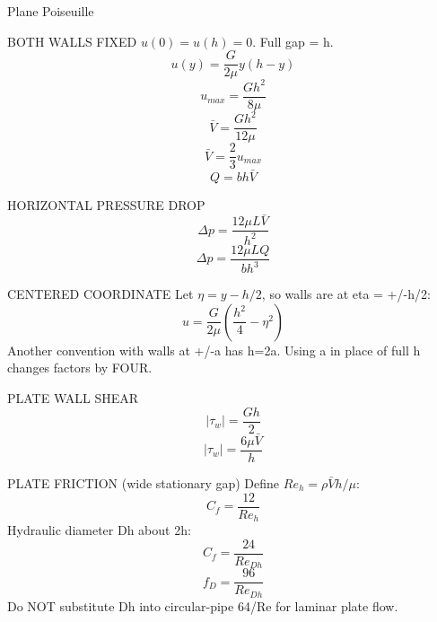 Plane Poiseuille

BOTH WALLS FIXED
$u(0)=u(h)=0$. Full gap = h.
$$u(y)=\frac{G}{2\mu}y(h-y)$$
$$u_{max}=\frac{Gh^2}{8\mu}$$
$$\bar V=\frac{Gh^2}{12\mu}$$
$$\bar V=\frac{2}{3}u_{max}$$
$$Q=bh\bar V$$

HORIZONTAL PRESSURE DROP
$$\Delta p=\frac{12\mu L\bar V}{h^2}$$
$$\Delta p=\frac{12\mu LQ}{bh^3}$$

CENTERED COORDINATE
Let $\eta=y-h/2$, so walls are at eta = +/-h/2:
$$u=\frac{G}{2\mu}(\frac{h^2}{4}-\eta^2)$$
Another convention with walls at +/-a has h=2a. Using a in place of full h changes factors by FOUR.

PLATE WALL SHEAR
$$|\tau_w|=\frac{Gh}{2}$$
$$|\tau_w|=\frac{6\mu\bar V}{h}$$

PLATE FRICTION (wide stationary gap)
Define $Re_h=\rho\bar Vh/\mu$:
$$C_f=\frac{12}{Re_h}$$
Hydraulic diameter Dh about 2h:
$$C_f=\frac{24}{Re_{Dh}}$$
$$f_D=\frac{96}{Re_{Dh}}$$
Do NOT substitute Dh into circular-pipe 64/Re for laminar plate flow.
